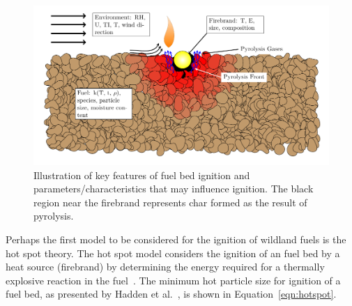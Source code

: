         \begin{figure}[hpbt]
            \centering
                \includegraphics[width=\textwidth]{Figures/dissertationBed.pdf}
            \caption{Illustration of key features of fuel bed ignition and parameters/characteristics that may influence ignition. The black region near the firebrand represents char formed as the result of pyrolysis.}
            \label{fig:ignitionDiagram}
        \end{figure}
    
    Perhaps the first model to be considered for the ignition of wildland fuels is the hot spot theory. The hot spot model considers the ignition of an fuel bed by a heat source (firebrand) by determining the energy required for a thermally explosive reaction in the fuel~\cite{Zinn1962InitiationSpots, Thomas1965}. The minimum hot particle size for ignition of a fuel bed, as presented by Hadden et al.~\cite{Hadden2011}, is shown in Equation~\ref{eqn:hotspot}. 
    
